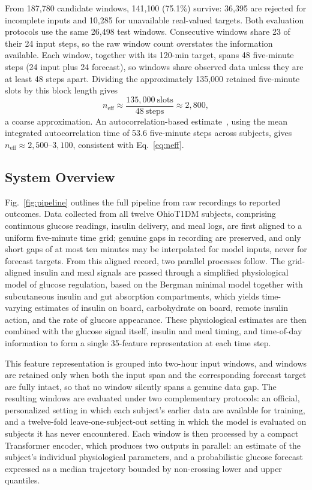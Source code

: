 \documentclass[journal]{IEEEtran}
\begin{document}
From 187,780 candidate windows, 141,100 (75.1\%) survive: 36,395 are rejected for incomplete inputs and 10,285 for unavailable real-valued targets. Both evaluation protocols use the same 26,498 test windows. Consecutive windows share 23 of their 24 input steps, so the raw window count overstates the information available. Each window, together with its 120-min target, spans 48 five-minute steps (24 input plus 24 forecast), so windows share observed data unless they are at least 48 steps apart. Dividing the approximately 135,000 retained five-minute slots by this block length gives
\begin{equation}
n_{\text{eff}} \approx \frac{135{,}000\ \text{slots}}{48\ \text{steps}} \approx 2{,}800,
\label{eq:neff}
\end{equation}
a coarse approximation. An autocorrelation-based estimate~\cite{refBH}, using the mean integrated autocorrelation time of 53.6 five-minute steps across subjects, gives $n_{\text{eff}} \approx 2{,}500$--$3{,}100$, consistent with Eq.~\eqref{eq:neff}.

\subsection{System Overview}

Fig.~\ref{fig:pipeline} outlines the full pipeline from raw recordings to reported outcomes. Data collected from all twelve OhioT1DM subjects, comprising continuous glucose readings, insulin delivery, and meal logs, are first aligned to a uniform five-minute time grid; genuine gaps in recording are preserved, and only short gaps of at most ten minutes may be interpolated for model inputs, never for forecast targets. From this aligned record, two parallel processes follow. The grid-aligned insulin and meal signals are passed through a simplified physiological model of glucose regulation, based on the Bergman minimal model together with subcutaneous insulin and gut absorption compartments, which yields time-varying estimates of insulin on board, carbohydrate on board, remote insulin action, and the rate of glucose appearance. These physiological estimates are then combined with the glucose signal itself, insulin and meal timing, and time-of-day information to form a single 35-feature representation at each time step.

This feature representation is grouped into two-hour input windows, and windows are retained only when both the input span and the corresponding forecast target are fully intact, so that no window silently spans a genuine data gap. The resulting windows are evaluated under two complementary protocols: an official, personalized setting in which each subject's earlier data are available for training, and a twelve-fold leave-one-subject-out setting in which the model is evaluated on subjects it has never encountered. Each window is then processed by a compact Transformer encoder, which produces two outputs in parallel: an estimate of the subject's individual physiological parameters, and a probabilistic glucose forecast expressed as a median trajectory bounded by non-crossing lower and upper quantiles.
\end{document}
